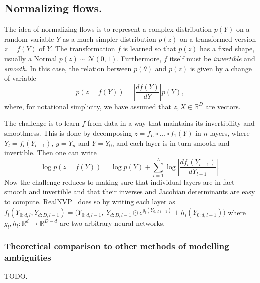 \subsection{Normalizing flows.}


The idea of normalizing flows is to represent a complex distribution $p(Y)$ on a random variable $Y$ as a much simpler distribution $p(z)$ on a transformed version $z=f(Y)$ of $Y$.
The transformation $f$ is learned so that $p(z)$ has a fixed shape, usually a Normal $p(z) \sim \mathcal{N}(0,1)$.
Furthermore, $f$ itself must be \emph{invertible} and \emph{smooth}.
In this case, the relation between $p(\theta)$ and $p(z)$ is given by a change of variable
$$
 p(z = f(Y)) =  \left| \frac{df(Y)}{dY} \right| p(Y),
$$
where, for notational simplicity, we have assumed that $z,X\in\mathbb{R}^D$ are vectors.

The challenge is to learn $f$ from data in a way that maintains its invertibility and smoothness.
This is done by decomposing $z = f_L \circ \dots \circ f_1 (Y)$ in $n$ layers, where $Y_l = f_l(Y_{l-1})$, $y = Y_n$ and $Y=Y_0$, and each layer is in turn smooth and invertible.
Then one can write
$$
 \log p(z = f(Y)) =
 \log p(Y) + \sum_{l=1}^L \log \left| \frac{df_l(Y_{l-1})}{dY_{l-1}} \right|.
$$
Now the challenge reduces to making sure that individual layers are in fact smooth and invertible and that their inverses and Jacobian determinants are easy to compute.
RealNVP~\cite{dinh17density} does so by writing each layer as $f_l(Y_{0:d,l}, Y_{d:D,l-1}) = \big(Y_{0:d,l-1},~ Y_{d:D,l-1} \odot e^{g_l(Y_{0:d,l-1})} + h_i(Y_{0:d,l-1})\big)$ where $g_l,h_l:\mathbb{R}^d \rightarrow \mathbb{R}^{D-d}$ are two arbitrary neural networks.

\subsubsection{Theoretical comparison to other methods of modelling ambiguities}
TODO.


